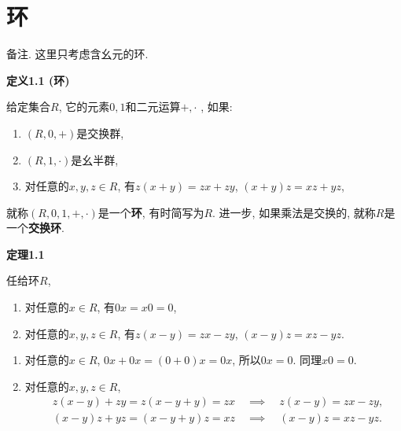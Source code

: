 \documentclass[UTF8]{ctexart}
\begin{document}
\setlength{\abovedisplayskip}{1pt}
\setlength{\belowdisplayskip}{1pt}

\section{环}

{\kaishu 备注.
这里只考虑含幺元的环.}

\vspace{10pt}

\hypertarget{sec:定义1.1}{}
\noindent\textbf{定义1.1 (环)}

给定集合$R$, 它的元素$0,1$和二元运算$+,\cdot$ , 如果:
\begin{enumerate}
    \item $(R,0,+)$是交换群,
    \item $(R,1,\cdot)$是幺半群,
    \item 对任意的$x,y,z\in R$, 有$z(x+y)=zx+zy$, $(x+y)z=xz+yz$,
\end{enumerate}
就称$(R,0,1,+,\cdot)$是一个\textbf{环}, 有时简写为$R$.
进一步, 如果乘法是交换的, 就称$R$是一个\textbf{交换环}.

\vspace{10pt}

\hypertarget{sec:定理1.1}{}
\noindent\textbf{定理1.1}

任给环$R$,
\begin{enumerate}
    \item 对任意的$x\in R$, 有$0x=x0=0$,
    \item 对任意的$x,y,z\in R$, 有$z(x-y)=zx-zy$, $(x-y)z=xz-yz$.
\end{enumerate}


\begin{enumerate}
    \item 对任意的$x\in R$, $0x+0x=(0+0)x=0x$, 所以$0x=0$. 同理$x0=0$.
    \item 对任意的$x,y,z\in R$,
    \begin{equation*}\begin{aligned}
        &z(x-y)+zy=z(x-y+y)=zx\quad\implies\quad z(x-y)=zx-zy,\\[-3pt]
        &(x-y)z+yz=(x-y+y)z=xz\quad\implies\quad(x-y)z=xz-yz.
    \end{aligned}\tag*{\qedsymbol}\end{equation*}
\end{enumerate}

\vspace{10pt}
\end{document}
